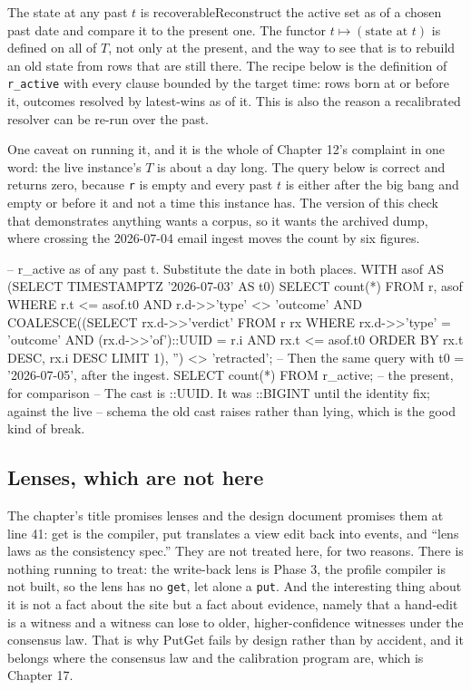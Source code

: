 \begin{Correspondence}{The state at any past $t$ is recoverable}{Reconstruct the active set as of a chosen past date and compare it to the present one.}
The functor $t \mapsto (\text{state at } t)$ is defined on all of $T$, not only at the present, and the way to see that is to rebuild an old state from rows that are still there. The recipe below is the definition of \texttt{r\_active} with every clause bounded by the target time: rows born at or before it, outcomes resolved by latest-wins as of it. This is also the reason a recalibrated resolver can be re-run over the past.

One caveat on running it, and it is the whole of Chapter 12's complaint in one word: the live instance's $T$ is about a day long. The query below is correct and returns zero, because \texttt{r} is empty and every past $t$ is either after the big bang and empty or before it and not a time this instance has. The version of this check that demonstrates anything wants a corpus, so it wants the archived dump, where crossing the 2026-07-04 email ingest moves the count by six figures.
\begin{Check}
-- r_active as of any past t. Substitute the date in both places.
WITH asof AS (SELECT TIMESTAMPTZ '2026-07-03' AS t0)
SELECT count(*) FROM r, asof
WHERE r.t <= asof.t0
  AND r.d->>'type' <> 'outcome'
  AND COALESCE((SELECT rx.d->>'verdict' FROM r rx
                WHERE rx.d->>'type' = 'outcome'
                  AND (rx.d->>'of')::UUID = r.i
                  AND rx.t <= asof.t0
                ORDER BY rx.t DESC, rx.i DESC LIMIT 1), '') <> 'retracted';
-- Then the same query with t0 = '2026-07-05', after the ingest.
SELECT count(*) FROM r_active;   -- the present, for comparison
-- The cast is ::UUID. It was ::BIGINT until the identity fix; against the live
-- schema the old cast raises rather than lying, which is the good kind of break.
\end{Check}
\end{Correspondence}

\subsection*{Lenses, which are not here}

The chapter's title promises lenses and the design document promises them at line 41: get is the compiler, put translates a view edit back into events, and ``lens laws as the consistency spec.'' They are not treated here, for two reasons. There is nothing running to treat: the write-back lens is Phase 3, the profile compiler is not built, so the lens has no \texttt{get}, let alone a \texttt{put}. And the interesting thing about it is not a fact about the site but a fact about evidence, namely that a hand-edit is a witness and a witness can lose to older, higher-confidence witnesses under the consensus law. That is why PutGet fails by design rather than by accident, and it belongs where the consensus law and the calibration program are, which is Chapter 17.

